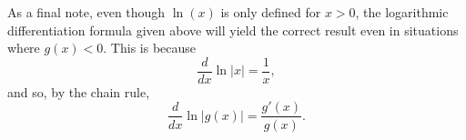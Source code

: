 \documentclass{ximera}
\begin{document}
As a final note, even though $\ln(x)$ is only defined for $x>0$, the logarithmic differentiation formula given above 
will yield the correct result even in situations where $g(x) <0$. This is because 
\[
\frac{d}{dx} \ln|x| = \frac{1}{x},
\]
and so, by the chain rule,
\[
\frac{d}{dx} \ln|g(x)| = \frac{g'(x)}{g(x)}.
\]
\end{document}
